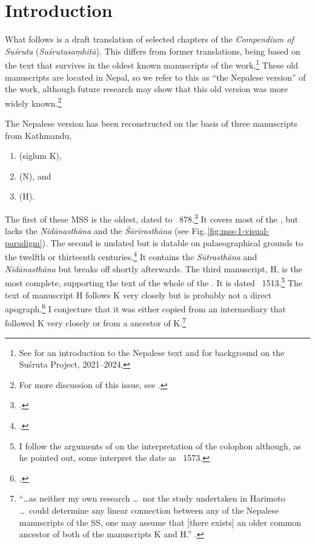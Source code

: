 
\chapter{Introduction}

What follows is a draft translation of selected chapters of the
\emph{Compendium of Suśruta} (\emph{Suśrutasaṃhitā}).  This differs
from former translations, being based on the text that survives in the
oldest known manuscripts of the work.\footnote{See \cite{wuja-2023}
    for an introduction to the Nepalese text and \cite{wuja-2021b} for
    background on the Suśruta Project, 2021--2024.}  These old manuscripts
    are located in Nepal, so we refer to this as “the Nepalese version” of
    the work, although future research may show that this old version was
    more widely known.\footnote{For more discussion of this issue, see 
    \cite[Introduction and ch.\,2]{wuja-2023}.}  
    
The Nepalese version has been reconstructed on the basis of three
manuscripts from Kathmandu,
    \begin{enumerate}
        \item {} (siglum K),
        \item {} (N), and
        \item {} (H).
    \end{enumerate}
The first of these MSS is the oldest, dated to
\CE~878.\footcite[15]{kleb-2021b}  It covers most of the \SS, but
lacks the \emph{Nidānasthāna} and the \emph{Śārīrasthāna} (see
Fig.\,\ref{fig:mss-1-visual-paradigm}).  The second is undated but is
datable on palaeographical grounds to the twelfth or thirteenth
centuries.\footcite[17--18]{kleb-2021b} It contains the
\emph{Sūtrasthāna} and \emph{Nidānasthāna} but breaks off shortly
afterwards.  The third manuscript, H, is the most complete, supporting
the text of the whole of the \SS. It is dated \CE~1513.\footnote{I
    follow the arguments of \citet[21--26]{kleb-2021b} on the
    interpretation of the colophon although, as he pointed out, some
    interpret the date as \CE\ 1573.} %
    The text of manuscript H follows K very closely but is probably
    not a direct apograph.\footcite{chak-2022} I conjecture that it
    was either copied from an intermediary that followed K very
    closely or from a ancestor of K.\footnote{“\ldots as neither my
        own research \ldots\ nor the study undertaken in Harimoto \ldots\
        could determine any linear connection between any of the Nepalese
        manuscripts of the SS, one may assume that [there exists] an older
        common ancestor of both of the manuscripts K and H.”
        \citep[21]{kleb-2021a}.}
        
